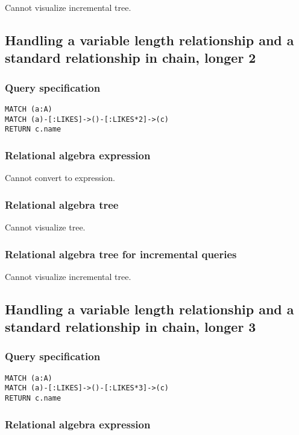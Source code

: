 Cannot visualize incremental tree.

\subsection{Handling a variable length relationship and a standard relationship in chain, longer 2}

\subsubsection*{Query specification}

\begin{lstlisting}
MATCH (a:A)
MATCH (a)-[:LIKES]->()-[:LIKES*2]->(c)
RETURN c.name
\end{lstlisting}

\subsubsection*{Relational algebra expression}

Cannot convert to expression.

\subsubsection*{Relational algebra tree}

Cannot visualize tree.

\subsubsection*{Relational algebra tree for incremental queries}

Cannot visualize incremental tree.

\subsection{Handling a variable length relationship and a standard relationship in chain, longer 3}

\subsubsection*{Query specification}

\begin{lstlisting}
MATCH (a:A)
MATCH (a)-[:LIKES]->()-[:LIKES*3]->(c)
RETURN c.name
\end{lstlisting}

\subsubsection*{Relational algebra expression}

